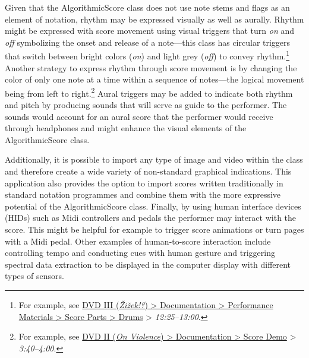 Given that the AlgorithmicScore class does not use note stems and flags as an element of notation, rhythm may be expressed visually as well as aurally. Rhythm might be expressed with score movement using visual triggers that turn \emph{on} and \emph{off} symbolizing the onset and release of a note---this class has circular triggers that switch between bright colors (\emph{on}) and light grey (\emph{off}) to convey rhythm.\footnote{For example, see \href{http://phd.federicoreuben.com/zizek/documentation/zizek-materials/zizek-parts/zizek-drums/}{DVD III (\emph{\v{Z}i\v{z}ek!?}) \tiny \textgreater \footnotesize \hspace{0pt} Documentation \tiny \textgreater \footnotesize \hspace{0pt} Performance Materials \tiny \textgreater \footnotesize \hspace{0pt} Score Parts \tiny \textgreater \footnotesize \hspace{0pt} Drums} \tiny \textgreater \footnotesize \hspace{0pt} \mbox{\emph{12:25--13:00}}.} Another strategy to express rhythm through score movement is by changing the color of only one note at a time within a sequence of notes---the logical movement being from left to right.\footnote{For example, see \href{http://phd.federicoreuben.com/onviolence/score-demo/}{DVD II (\emph{On Violence}) \tiny \textgreater \footnotesize \hspace{0pt} Documentation \tiny \textgreater \footnotesize \hspace{0pt} Score Demo} \tiny \textgreater \footnotesize  \hspace{0pt} \mbox{\emph{3:40--4:00}}.} Aural triggers may be added to indicate both rhythm and pitch by producing sounds that will serve as guide to the performer. The sounds would account for an aural score that the performer would receive through headphones and might enhance the visual elements of the AlgorithmicScore class.

Additionally, it is possible to import any type of image and video within the class and therefore create a wide variety of non-standard graphical indications. This application also provides the option to import scores written traditionally in standard notation programmes and combine them with the more expressive potential of the AlgorithmicScore class. Finally, by using human interface devices (HIDs) such as Midi controllers and pedals the performer may interact with the score. This might be helpful for example to trigger score animations or turn pages with a Midi pedal. Other examples of human-to-score interaction include controlling tempo and conducting cues with human gesture and triggering spectral data extraction to be displayed in the computer display with different types of sensors. 

